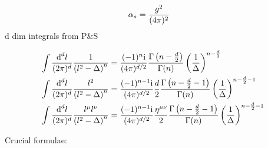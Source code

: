 \ifdefined\mainprogram{}
\else

\fi

\begin{align}
	\alpha_s &= \frac{g^2}{(4\pi)^2}
\end{align}
d dim integrals from P$\&$S

\begin{align}
\int \frac{\text{d} ^d l}{(2\pi)^d} \frac{1}{\left(l^2-\Delta\right)^n} 
&=
\frac{(-1)^n\text{i}}{(4\pi)^{d/2}} \frac{\Gamma\left(n-\frac{d}{2}\right)}{\Gamma(n)}\left(\frac{1}{\Delta}\right)^{n-\frac{d}{2}}
\\
\int \frac{\text{d} ^d l}{(2\pi)^d} \frac{l^2}{\left(l^2-\Delta\right)^n} 
&=
\frac{(-1)^{n-1}\text{i}}{(4\pi)^{d/2}}\frac{d}{2} \frac{\Gamma\left(n-\frac{d}{2}-1\right)}{\Gamma(n)}\left(\frac{1}{\Delta}\right)^{n-\frac{d}{2}-1}
\\
\int \frac{\text{d} ^d l}{(2\pi)^d} \frac{l^	\mu l^\nu}{\left(l^2-\Delta\right)^n} 
&=
\frac{(-1)^{n-1}\text{i}}{(4\pi)^{d/2}}\frac{\eta^{\mu \nu}}{2} \frac{\Gamma\left(n-\frac{d}{2}-1\right)}{\Gamma(n)}\left(\frac{1}{\Delta}\right)^{n-\frac{d}{2}-1}
\end{align}

Crucial formulae:


